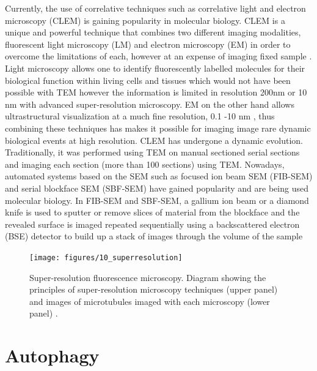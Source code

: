 Currently, the use of correlative techniques such as correlative light and electron microscopy (CLEM) is gaining popularity in molecular biology. CLEM is a unique and powerful technique that combines two different imaging modalities, fluorescent light microscopy (LM) and electron microscopy (EM) in order to overcome the limitations of each, however at an expense of imaging fixed sample \citep{Russell2017}. Light microscopy allows one to identify fluorescently labelled molecules for their biological function within living cells and tissues which would not have been possible with TEM however the information is limited in resolution 200nm or 10 nm with advanced super-resolution microscopy.  EM on the other hand allows ultrastructural visualization at a much fine resolution, 0.1 -10 nm \citep{Feng2018}, thus combining these techniques has makes it possible for imaging image  rare dynamic biological events at high resolution. CLEM has undergone a dynamic evolution. Traditionally, it was performed using TEM on manual sectioned serial sections and imaging each section (more than 100 sections) using TEM. Nowadays, automated systems  based on the SEM such as focused ion beam SEM (FIB-SEM) \citep{Heymann2006} and serial blockface SEM (SBF-SEM) \citep{Denk2004} have gained popularity and are being used molecular biology. In FIB-SEM and SBF-SEM, a gallium ion beam  or a diamond knife is used to sputter or remove slices of material from the blockface and the revealed surface is imaged repeated sequentially using a backscattered electron (BSE) detector to build up a stack of images through the volume of the sample \citep{Russell2017}

\begin{figure}[h!]
  \texttt{[image: figures/10\_superresolution]}
  \caption{Super-resolution fluorescence microscopy. Diagram showing the principles of super-resolution microscopy techniques (upper panel) and images  of microtubules imaged with each microscopy (lower panel) \citep{Feng2018}.}
  \label{fig:10_superresolution}
\end{figure}

\section{Autophagy}
